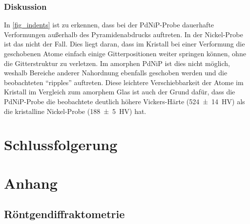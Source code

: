 \documentclass[
	a4paper,
	12pt,
	pagesize,
	ngerman
]{scrartcl}
\begin{document}
	\subsubsection{Diskussion}

	In \cref{fig_indents} ist zu erkennen, dass bei der PdNiP-Probe dauerhafte Verformungen außerhalb des Pyramidenabdrucks auftreten.
	In der Nickel-Probe ist das nicht der Fall.
	Dies liegt daran, dass im Kristall bei einer Verformung die geschobenen Atome einfach einige Gitterpositionen weiter springen können, ohne die Gitterstruktur zu verletzen.
	Im amorphen PdNiP ist dies nicht möglich, weshalb Bereiche anderer Nahordnung ebenfalls geschoben werden und die beobachteten \enquote{ripples} auftreten. %
	Diese leichtere Verschiebbarkeit der Atome im Kristall im Vergleich zum amorphem Glas ist auch der Grund dafür, dass die PdNiP-Probe die beobachtete deutlich höhere Vickers-Härte (\SI{524 \pm 14}{HV}) als die kristalline Nickel-Probe (\SI{188 \pm 5}{HV}) hat.

	\section{Schlussfolgerung}

	\printbibliography



	\section{Anhang} \label{s_anhang}
	\subsection{Röntgendiffraktometrie}
\end{document}
